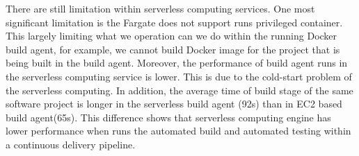 \par
There are still limitation within serverless computing services. One most significant limitation is the Fargate does not support runs privileged container. This largely limiting what we operation can we do within the running Docker build agent, for example, we cannot build Docker image for the project that is being built in the build agent. Moreover, the performance of build agent runs in the serverless computing service is lower. This is due to the cold-start problem of the serverless computing. In addition, the average time of build stage of the same software project is longer in the serverless build agent (92s) than in EC2 based build agent(65s). This difference shows that serverless computing engine has lower performance when runs the automated build and automated testing within a continuous delivery pipeline.

